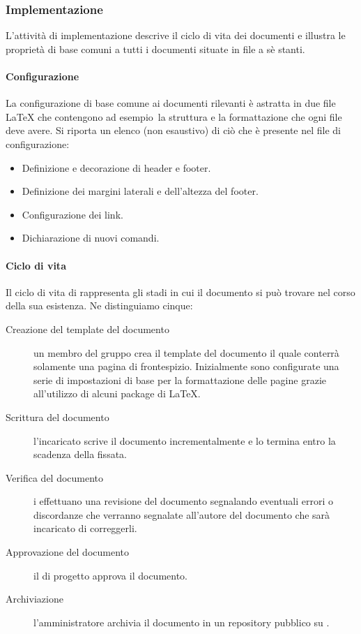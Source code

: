 \documentclass[../norme-di-progetto.tex]{subfiles}
\begin{document}
\subsubsection{Implementazione}%
\label{subs:implementazione}
L'attività di implementazione descrive il ciclo di vita dei documenti e illustra le proprietà di base comuni a tutti i documenti situate in file a sè stanti.

\paragraph{Configurazione}%
\label{par:configurazione}
La configurazione di base comune ai documenti rilevanti è astratta in due file \LaTeX{} che contengono ad esempio\ la struttura e la formattazione che ogni file deve avere.
Si riporta un elenco (non esaustivo) di ciò che è presente nel file di configurazione:

\begin{itemize}
  \item Definizione e decorazione di header e footer.
  \item Definizione dei margini laterali e dell'altezza del footer.
  \item Configurazione dei link.
  \item Dichiarazione di nuovi comandi.
\end{itemize}

\paragraph{Ciclo di vita}%
\label{par:ciclo_di_vita}
Il ciclo di vita di rappresenta gli stadi in cui il documento si può trovare nel corso della sua esistenza. Ne distinguiamo cinque:

\begin{description}
  \item [Creazione del template del documento] un membro del gruppo crea il template del documento il quale conterrà solamente una pagina di frontespizio. Inizialmente sono configurate una serie di impostazioni di base per la formattazione delle pagine grazie all'utilizzo di alcuni package di \LaTeX.
  \item [Scrittura del documento] l'incaricato scrive il documento incrementalmente e lo termina entro la scadenza della  fissata.
  \item [Verifica del documento] i  effettuano una revisione del documento segnalando eventuali errori o discordanze che verranno segnalate all'autore del documento che sarà incaricato di correggerli.
  \item [Approvazione del documento] il  di progetto approva il documento.
  \item [Archiviazione] l'amministratore archivia il documento in un repository pubblico su .
\end{description}
\end{document}
